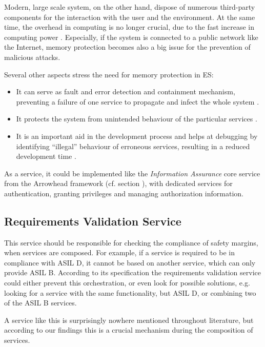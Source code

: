 Modern, large scale system, on the other hand, dispose of numerous third-party components for the interaction with the user and the environment. At the same time, the overhead in computing is no longer crucial, due to the fast increase in computing power  \cite{yamada2008}. Especially, if the system is connected to a public network like the Internet, memory protection becomes also a big issue for the prevention of malicious attacks.

Several other aspects stress the need for memory protection in ES:
\begin{itemize}
\item It can serve as fault and error detection and containment mechanism, preventing a failure of one service to propagate and infect the whole system \cite{yamada2008}.
\item It protects the system from unintended behaviour of the particular services \cite{yamada2014}.
\item It is an important aid in the development process and helps at debugging by identifying ``illegal'' behaviour of erroneous services, resulting in a reduced development time \cite{yamada2008} \cite{yamada2014}.
\end{itemize}

As a service, it could be implemented like the \emph{Information Assurance} core service from the Arrowhead framework (cf. section \label{ch:system_layers}), with dedicated services for authentication, granting privileges and managing authorization information.


\subsection{Requirements Validation Service}

This service should be responsible for checking the compliance of safety margins, when services are composed. For example, if a service is required to be in compliance with ASIL D, it cannot be based on another service, which can only provide ASIL B. According to its specification the requirements validation service could either prevent this orchestration, or even look for possible solutions, e.g. looking for a service with the same functionality, but ASIL D, or combining two of the ASIL B services.

A service like this is surprisingly nowhere mentioned throughout literature, but according to our findings this is a crucial mechanism during the composition of services.








